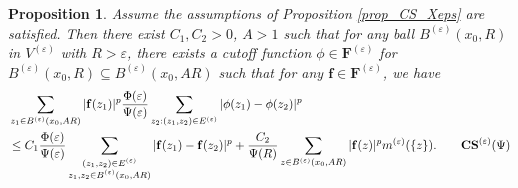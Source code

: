\documentclass[11pt,a4paper]{article}
\numberwithin{equation}{section}
\theoremstyle{plain}
\newtheorem{proposition}[theorem]{Proposition}
\theoremstyle{definition}
\begin{document}
\begin{proposition}\label{prop_CS_Veps}
Assume the assumptions of Proposition \ref{prop_CS_Xeps} are satisfied. Then there exist $C_1, C_2>0$, $A>1$ such that for any ball $B^{(\varepsilon)}(x_0,R)$ in $V^{(\varepsilon)}$ with $R>\varepsilon$, there exists a cutoff function $\phi\in\mathbf{F}^{(\varepsilon)}$ for $B^{(\varepsilon)}(x_0,R)\subseteq B^{(\varepsilon)}(x_0,AR)$ such that for any $\mathbf{f}\in\mathbf{F}^{(\varepsilon)}$, we have
\begin{align*}
&\sum_{z_1\in B^{(\varepsilon)}(x_0,AR)}|\mathbf{f}(z_1)|^p \frac{\Phi(\varepsilon)}{\Psi(\varepsilon)}\sum_{z_2:(z_1,z_2)\in E^{(\varepsilon)}}|\phi(z_1)-\phi(z_2)|^p\\
&\le C_1\frac{\Phi(\varepsilon)}{\Psi(\varepsilon)}\sum_{\substack{(z_1,z_2)\in E^{(\varepsilon)}\\z_1,z_2\in B^{(\varepsilon)}(x_0,AR)}}|\mathbf{f}(z_1)-\mathbf{f}(z_2)|^p+\frac{C_2}{\Psi(R)}\sum_{z\in B^{(\varepsilon)}(x_0,AR)}|\mathbf{f}(z)|^pm^{(\varepsilon)}(\{z\}).\label{eq_CS_Veps}\tag*{$\mathbf{CS}^{(\varepsilon)}(\Psi)$}
\end{align*}
\end{proposition}
\end{document}
